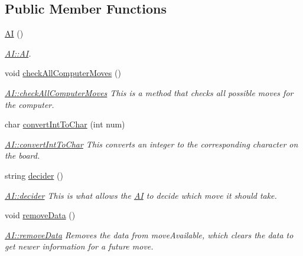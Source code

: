 \subsection*{Public Member Functions}
\begin{DoxyCompactItemize}
\item 
\hyperlink{class_a_i_a64ec60281e9eb8496f16525615db54b7}{A\-I} ()
\begin{DoxyCompactList}\small\item\em \hyperlink{class_a_i_a64ec60281e9eb8496f16525615db54b7}{A\-I\-::\-A\-I}. \end{DoxyCompactList}\item 
void \hyperlink{class_a_i_a8a7ea06489e3e3dfffbb25fbe384c205}{check\-All\-Computer\-Moves} ()
\begin{DoxyCompactList}\small\item\em \hyperlink{class_a_i_a8a7ea06489e3e3dfffbb25fbe384c205}{A\-I\-::check\-All\-Computer\-Moves} This is a method that checks all possible moves for the computer. \end{DoxyCompactList}\item 
char \hyperlink{class_a_i_aab57c3d86a7f49616d9ddeefc6978e05}{convert\-Int\-To\-Char} (int num)
\begin{DoxyCompactList}\small\item\em \hyperlink{class_a_i_aab57c3d86a7f49616d9ddeefc6978e05}{A\-I\-::convert\-Int\-To\-Char} This converts an integer to the corresponding character on the board. \end{DoxyCompactList}\item 
string \hyperlink{class_a_i_af048f2550307ee0ff15709d8e1b452b2}{decider} ()
\begin{DoxyCompactList}\small\item\em \hyperlink{class_a_i_af048f2550307ee0ff15709d8e1b452b2}{A\-I\-::decider} This is what allows the \hyperlink{class_a_i}{A\-I} to decide which move it should take. \end{DoxyCompactList}\item 
void \hyperlink{class_a_i_ae19027dd80147020d2aa55fbae3113b3}{remove\-Data} ()
\begin{DoxyCompactList}\small\item\em \hyperlink{class_a_i_ae19027dd80147020d2aa55fbae3113b3}{A\-I\-::remove\-Data} Removes the data from move\-Available, which clears the data to get newer information for a future move. \end{DoxyCompactList}\end{DoxyCompactItemize}
